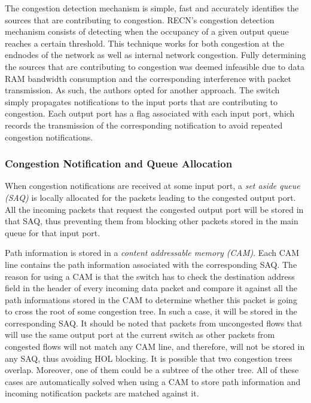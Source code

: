 The congestion detection mechanism is simple, fast and accurately identifies the sources that are contributing to congestion. RECN's congestion detection mechanism consists of detecting when the occupancy of a given output queue reaches a certain threshold. This technique works for both congestion at the endnodes of the network as well as internal network congestion. Fully determining the sources that are contributing to congestion was deemed infeasible due to data RAM bandwidth consumption and the corresponding interference with packet transmission. As such, the authors opted for another approach. The switch simply propagates notifications to the input ports that are contributing to congestion. Each output port has a flag associated with each input port, which records the transmission of the corresponding notification to avoid repeated congestion notifications.

\subsubsection{Congestion Notification and Queue Allocation}

When congestion notifications are received at some input port, a \emph{set aside queue (SAQ)} is locally allocated for the packets leading to the congested output port. All the incoming packets that request the congested output port will be stored in that SAQ, thus preventing them from blocking other packets stored in the main queue for that input port.

Path information is stored in a \emph{content addressable memory (CAM)}. Each CAM line contains the path information associated with the corresponding SAQ. The reason for using a CAM is that the switch has to check the destination address field in the header of every incoming data packet and compare it against all the path informations stored in the CAM to determine whether this packet is going to cross the root of some congestion tree. In such a case, it will be stored in the corresponding SAQ. It should be noted that packets from uncongested flows that will use the same output port at the current switch as other packets from congested flows will not match any CAM line, and therefore, will not be stored in any SAQ, thus avoiding HOL blocking. It is possible that two congestion trees overlap. Moreover, one of them could be a subtree of the other tree. All of these cases are automatically solved when using a CAM to store path information and incoming notification packets are matched against it.

